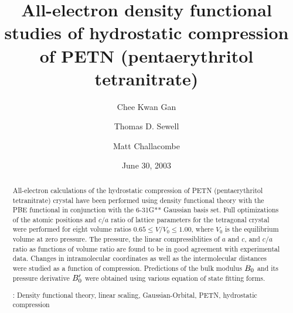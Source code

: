 \documentclass[prb,aps,nobibnotes,twocolumn,doublespace,twocolumngrid,superbib]{revtex4}
\begin{document}
\title[Short Title]{ 
All-electron density functional studies of hydrostatic compression of 
PETN (pentaerythritol tetranitrate)}
\author{Chee Kwan Gan\footnotemark[1]}
\author{Thomas D. Sewell\footnotemark[2]}
\author{Matt Challacombe\footnotemark[3]}

\date{June 30, 2003}

\begin{abstract}
All-electron calculations of the hydrostatic compression of
PETN (pentaerythritol tetranitrate) crystal have been performed using
density functional theory with the PBE functional in
conjunction with the 6-31G** Gaussian basis set.  Full optimizations
of the atomic positions and $c/a$ ratio of lattice parameters for the 
tetragonal crystal were performed for eight volume ratios $0.65 
\le V/V_0 \le 1.00$, where $V_0$ is the equilibrium volume at zero
pressure.  The pressure, the linear compressiblities
of $a$ and $c$, and $c/a$ ratio as functions of volume ratio
are found to be in good agreement with experimental data.
Changes in intramolecular coordinates as well as the intermolecular 
distances were studied as a function of compression.
Predictions of the bulk modulus $B_0$ and 
its pressure derivative ${B'_0}$ were obtained
using various equation of state fitting forms.

\smallskip
{}: Density functional theory, linear scaling, 
Gaussian-Orbital, PETN, hydrostatic compression
\end{abstract}

\maketitle

\end{document}
